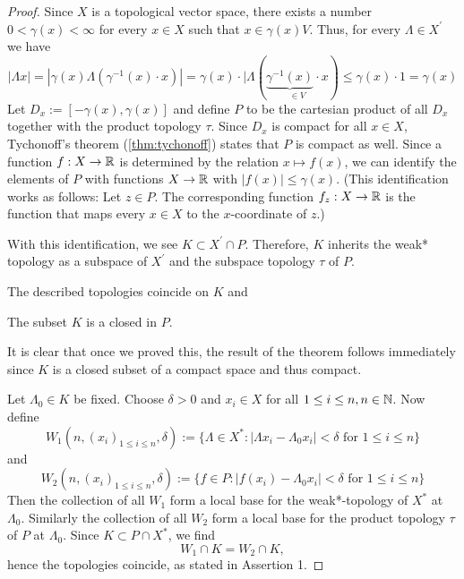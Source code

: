 \begin{proof}
	Since $X$ is a topological vector space, there exists a number $0<\gamma(x)<\infty$ for every $x\in X$ such that $x\in \gamma(x)V$. %
	Thus, for every $\Lambda\in X^\prime$ we have
	\[
	|\Lambda x|=|\gamma(x)\Lambda(\gamma^{-1}(x)\cdot x)|=\gamma(x)\cdot|\Lambda(\underset{\in V}{\underbrace{\gamma^{-1}(x)}\cdot x})\leq \gamma(x)\cdot 1=\gamma(x)
	\]
	Let $D_x:=[-\gamma(x),\gamma(x)]$ and define $P$ to be the cartesian product of all $D_x$ together with the product topology $\tau$. Since $D_x$ is compact for all $x\in X$, Tychonoff's theorem (\autoref{thm:tychonoff}) states that $P$ is compact as well. Since a function $f:X\to \mathbb{R}$ is determined by the relation $x\mapsto f(x)$, we can identify the elements of $P$ with functions $X\to \mathbb{R}$ with $|f(x)|\leq \gamma(x)$. (This identification works as follows: Let $z\in P$. The corresponding function $f_z:X\to\mathbb{R}$ is the function that maps every $x\in X$ to the $x$-coordinate of $z$.)
	
	With this identification, we see $K\subset X^\prime\cap P$. Therefore, $K$ inherits the weak* topology as a subspace of  $X^\prime$ and the subspace topology $\tau$ of $P$.
	\begin{myassertion}
		The described topologies coincide on $K$ and
	\end{myassertion}
	\begin{myassertion}
		The subset $K$ is a closed in $P$.
	\end{myassertion}

	It is clear that %
	once we proved this, the result of the theorem follows immediately since $K$ is a closed subset of a compact space and thus compact.
	
	Let $\Lambda_0\in K$ be fixed. Choose $\delta>0$ and $x_i\in X$ for all $1\leq i \leq n, n\in \mathbb{N}$. Now define
	\[
	W_1(n,(x_i)_{1\leq i\leq n},\delta):=\{\Lambda\in X^\ast\colon |\Lambda x_i-\Lambda_0 x_i|<\delta \text{ for } 1\leq i\leq n\}
	\]
	and
	\[
	W_2(n,(x_i)_{1\leq i\leq n},\delta):=\{f\in P\colon |f(x_i)-\Lambda_0 x_i|<\delta \text{ for } 1\leq i\leq n\}
	\]
	Then the collection of all $W_1$ form a local base for the weak*-topology of $X^\ast$ at $\Lambda_0$. Similarly the collection of all $W_2$ form a local base for the product topology $\tau$ of $P$ at $\Lambda_0$. Since $K\subset P\cap X^\ast$, we find
	\[
	W_1\cap K=W_2\cap K,
	\]
	hence the topologies coincide, as stated in Assertion 1.
	

\end{proof}
